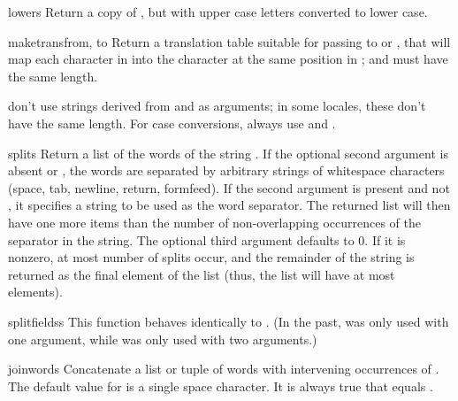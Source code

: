 \begin{funcdesc}{lower}{s}
  Return a copy of , but with upper case letters converted to
  lower case.
\end{funcdesc}

\begin{funcdesc}{maketrans}{from, to}
  Return a translation table suitable for passing to
   or , that will map
  each character in  into the character at the same position
  in ;  and  must have the same length.

   don't use strings derived from 
  and  as arguments; in some locales, these don't have
  the same length.  For case conversions, always use
   and .
\end{funcdesc}

\begin{funcdesc}{split}{s}
  Return a list of the words of the string .  If the optional
  second argument  is absent or , the words are
  separated by arbitrary strings of whitespace characters (space, tab, 
  newline, return, formfeed).  If the second argument  is
  present and not , it specifies a string to be used as the 
  word separator.  The returned list will then have one more items
  than the number of non-overlapping occurrences of the separator in
  the string.  The optional third argument  defaults to
  0.  If it is nonzero, at most  number of splits occur,
  and the remainder of the string is returned as the final element of
  the list (thus, the list will have at most 
  elements).
\end{funcdesc}

\begin{funcdesc}{splitfields}{s}
  This function behaves identically to .  (In the
  past,  was only used with one argument, while
   was only used with two arguments.)
\end{funcdesc}

\begin{funcdesc}{join}{words}
  Concatenate a list or tuple of words with intervening occurrences of 
  .  The default value for  is a single space
  character.  It is always true that
  equals .
\end{funcdesc}

